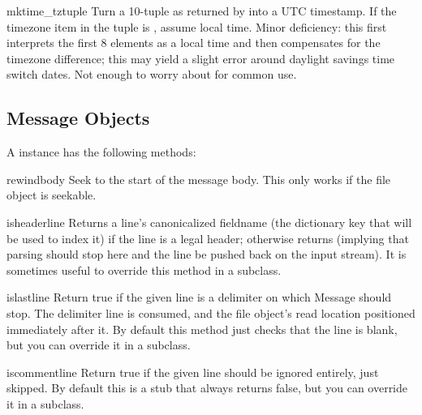 \begin{funcdesc}{mktime_tz}{tuple}
Turn a 10-tuple as returned by  into a UTC
timestamp.  If the timezone item in the tuple is , assume
local time.  Minor deficiency: this first interprets the first 8
elements as a local time and then compensates for the timezone
difference; this may yield a slight error around daylight savings time
switch dates.  Not enough to worry about for common use.
\end{funcdesc}


\begin{seealso}
\end{seealso}


\subsection{Message Objects \label{message-objects}}

A  instance has the following methods:

\begin{methoddesc}{rewindbody}{}
Seek to the start of the message body.  This only works if the file
object is seekable.
\end{methoddesc}

\begin{methoddesc}{isheader}{line}
Returns a line's canonicalized fieldname (the dictionary key that will
be used to index it) if the line is a legal  header; otherwise
returns  (implying that parsing should stop here and the
line be pushed back on the input stream).  It is sometimes useful to
override this method in a subclass.
\end{methoddesc}

\begin{methoddesc}{islast}{line}
Return true if the given line is a delimiter on which Message should
stop.  The delimiter line is consumed, and the file object's read
location positioned immediately after it.  By default this method just
checks that the line is blank, but you can override it in a subclass.
\end{methoddesc}

\begin{methoddesc}{iscomment}{line}
Return true if the given line should be ignored entirely, just skipped.
By default this is a stub that always returns false, but you can
override it in a subclass.
\end{methoddesc}

